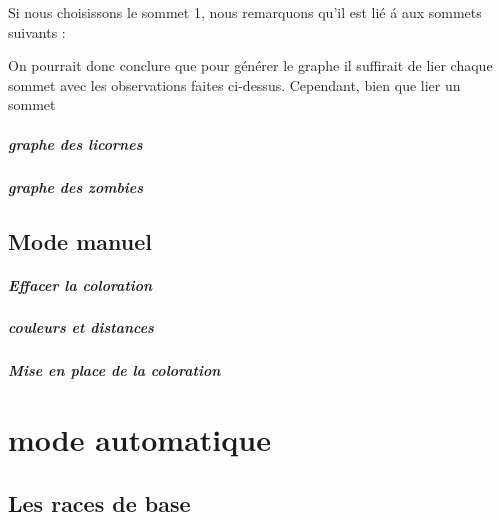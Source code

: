 \documentclass{report}
\begin{document}
			Si nous choisissons le sommet 1, nous remarquons qu'il est li\'e \'a aux sommets suivants :
			
			
			On pourrait donc conclure que pour générer le graphe il suffirait de lier chaque sommet avec les observations faites ci-dessus. Cependant, bien que lier un sommet
			
			
			
			
			
			
			\paragraph{graphe des licornes}
			\paragraph{graphe des zombies}
		\section{Mode manuel}
			\paragraph{Effacer la coloration}
			\paragraph{couleurs et distances}
			\paragraph{Mise en place de la coloration}
			
			
	\chapter{mode automatique}
		\section{Les races de base}
\end{document}
